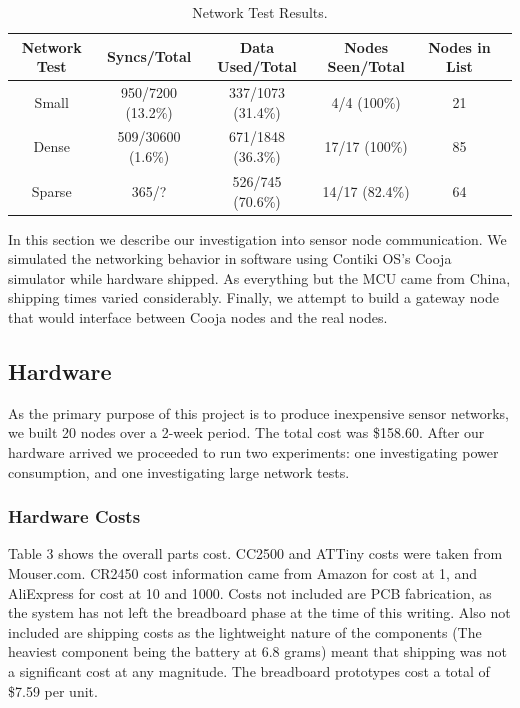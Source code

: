 %
%
\begin{table}

  \caption{Network Test Results.
  \label{table:network_tests}
  }
  
  \begin{tabular}{| c | c | c | c | c | c |}

  \hline
  \textbf{Network Test} & \textbf{Syncs/Total} & \textbf{Data Used/Total} & \textbf{Nodes Seen/Total} & \textbf{Nodes in List}\\
  \hline
  Small        & 950/7200 (13.2\%) & 337/1073 (31.4\%) & 4/4 (100\%) & 21\\
  Dense       & 509/30600 (1.6\%) & 671/1848 (36.3\%) & 17/17 (100\%) & 85\\
  Sparse      & 365/? & 526/745 (70.6\%) & 14/17 (82.4\%) & 64 \\
  \hline
  
  \end{tabular}  

\end{table}

In this section we describe our investigation into sensor node communication. We simulated the networking behavior in software using Contiki OS's Cooja simulator while hardware shipped. As everything but the MCU came from China, shipping times varied considerably. Finally, we attempt to build a gateway node that would interface between Cooja nodes and the real nodes.


\subsection{Hardware}

As the primary purpose of this project is to produce inexpensive sensor networks, we built 20 nodes over a 2-week period. The total cost was \$158.60. After our hardware arrived we proceeded to run two experiments: one investigating power consumption, and one investigating large network tests.

\subsubsection{Hardware Costs}

Table 3 shows the overall parts cost. CC2500 and ATTiny costs were taken from Mouser.com. CR2450 cost information came from Amazon for cost at 1, and AliExpress for cost at 10 and 1000. Costs not included are PCB fabrication, as the system has not left the breadboard phase at the time of this writing. Also not included are shipping costs as the lightweight nature of the components (The heaviest component being the battery at 6.8 grams) meant that shipping was not a significant cost at any magnitude. The breadboard prototypes cost a total of \$7.59 per unit.

